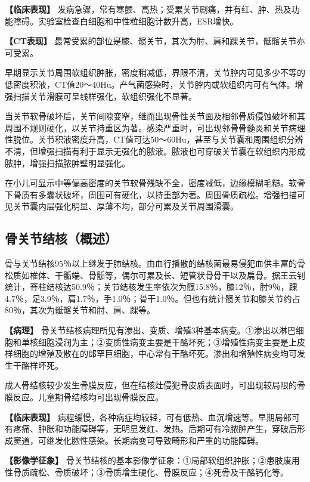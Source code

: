 \textbf{【临床表现】}
发病急骤，常有寒颤、高热；受累关节剧痛，并有红、肿、热及功能障碍。实验室检查白细胞和中性粒细胞计数升高，ESR增快。

\textbf{【CT表现】}
最常受累的部位是膝、髋关节，其次为肘、肩和踝关节，骶髂关节亦可受累。

早期显示关节周围软组织肿胀，密度稍减低，界限不清，关节腔内可见多少不等的低密度积液，CT值20～40Hu。产气菌感染时，关节腔内或软组织内可有气体。增强扫描关节滑膜可呈线样强化，软组织强化不显著。

当关节软骨破坏后，关节间隙变窄，继而出现骨性关节面及相邻骨质侵蚀破坏和其周围不规则硬化，以关节持重区为著。感染严重时，可出现邻骨骨髓炎和关节病理性脱位。关节积液密度升高，CT值可达50～60Hu，甚至与关节囊和周围组织分辨不清，但增强扫描有利于显示无强化的脓液。脓液也可穿破关节囊在软组织内形成脓肿，增强扫描脓肿壁明显强化。

在小儿可显示中等偏高密度的关节软骨残缺不全，密度减低，边缘模糊毛糙。软骨下骨质有多囊状破坏，周围可有硬化，以持重部为著。周围骨质疏松。增强扫描可见关节囊内层强化明显、厚薄不均，部分可累及关节周围滑囊。

\subsection{骨关节结核（概述）}

骨与关节结核95％以上继发于肺结核。由血行播散的结核菌最易侵犯血供丰富的骨松质如椎体、干骺端、骨骺等，偶尔可累及长、短管状骨骨干以及扁骨。据王云钊统计，脊柱结核达50.9％；关节结核发生率依次为髋15.8％，膝12％，肘9％，踝4.7％，足3.9％，肩1.7％，手1.0％；骨干1.0％。但也有统计髋关节和膝关节约占80％，其次为骶髂关节和肘、肩、踝等。

\textbf{【病理】}
骨关节结核病理所见有渗出、变质、增殖3种基本病变。①渗出以淋巴细胞和单核细胞浸润为主；②变质性病变主要是干酪坏死；③增殖性病变主要是上皮样细胞的增殖及散在的郎罕巨细胞，中心常有干酪坏死。渗出和增殖性病变均可发生干酪样坏死。

成人骨结核较少发生骨膜反应，但在结核灶侵犯骨皮质表面时，可出现较局限的骨膜反应。儿童期骨结核均可出现骨膜反应。

\textbf{【临床表现】}
病程缓慢，各种病症均较轻，可有低热、血沉增速等。早期局部可有疼痛、肿胀和功能障碍等，无明显发红、发热。后期可有冷脓肿产生，穿破后形成窦道，可继发化脓性感染。长期病变可导致畸形和严重的功能障碍。

\textbf{【影像学征象】}
骨关节结核的基本影像学征象：①局部软组织肿胀；②患肢废用性骨质疏松、骨质破坏；③骨质增生硬化、骨膜反应；④死骨及干酪钙化等。


